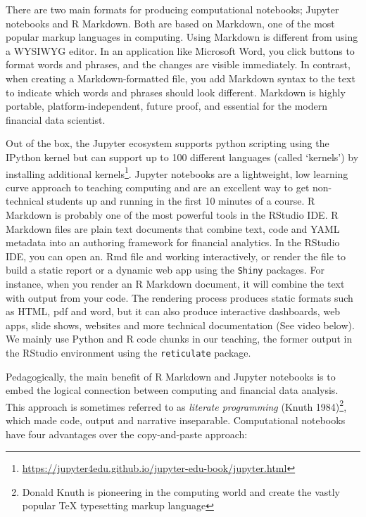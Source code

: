 \documentclass{article}
\begin{document}
There are two main formats for producing computational notebooks;
Jupyter notebooks and R Markdown. Both are based on Markdown, one of the
most popular markup languages in computing. Using Markdown is different
from using a WYSIWYG editor. In an application like Microsoft Word, you
click buttons to format words and phrases, and the changes are visible
immediately. In contrast, when creating a Markdown-formatted file, you
add Markdown syntax to the text to indicate which words and phrases
should look different. Markdown is highly portable,
platform-independent, future proof, and essential for the modern
financial data scientist.

Out of the box, the Jupyter ecosystem supports python scripting using
the IPython kernel but can support up to 100 different languages (called
`kernels') by installing additional kernels\footnote{\url{https://jupyter4edu.github.io/jupyter-edu-book/jupyter.html}}.
Jupyter notebooks are a lightweight, low learning curve approach to
teaching computing and are an excellent way to get non-technical
students up and running in the first 10 minutes of a course. R Markdown
is probably one of the most powerful tools in the RStudio IDE. R
Markdown files are plain text documents that combine text, code and YAML
metadata into an authoring framework for financial analytics. In the
RStudio IDE, you can open an. Rmd file and working interactively, or
render the file to build a static report or a dynamic web app using the
\texttt{Shiny} packages. For instance, when you render an R Markdown
document, it will combine the text with output from your code. The
rendering process produces static formats such as HTML, pdf and word,
but it can also produce interactive dashboards, web apps, slide shows,
websites and more technical documentation (See video below). We mainly
use Python and R code chunks in our teaching, the former output in the
RStudio environment using the \texttt{reticulate} package.

Pedagogically, the main benefit of R Markdown and Jupyter notebooks is
to embed the logical connection between computing and financial data
analysis. This approach is sometimes referred to as \emph{literate
programming} (Knuth 1984)\footnote{Donald Knuth is pioneering in the
  computing world and create the vastly popular TeX typesetting markup
  language}, which made code, output and narrative inseparable.
Computational notebooks have four advantages over the copy-and-paste
approach:
\end{document}
